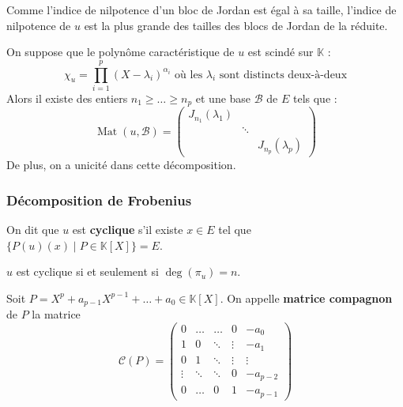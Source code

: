 	\begin{remark}
		Comme l'indice de nilpotence d'un bloc de Jordan est égal à sa taille, l'indice de nilpotence de $u$ est la plus grande des tailles des blocs de Jordan de la réduite.
	\end{remark}


	\begin{theorem}
		On suppose que le polynôme caractéristique de $u$ est scindé sur $\mathbb{K}$ :
		\[ \chi_u = \prod_{i=1}^p (X - \lambda_i)^{\alpha_i} \text{ où les } \lambda_i \text{ sont distincts deux-à-deux} \]
		Alors il existe des entiers $n_1 \geq \dots \geq n_p$ et une base $\mathcal{B}$ de $E$ tels que :
		\[ \operatorname{Mat}(u, \mathcal{B}) = \begin{pmatrix} J_{n_1}(\lambda_1) & & \\ & \ddots & \\ & & J_{n_p}(\lambda_p) \end{pmatrix} \]
		De plus, on a unicité dans cette décomposition.
	\end{theorem}

	\subsubsection{Décomposition de Frobenius}


	\begin{definition}
	  \label{151-2}
		On dit que $u$ est \textbf{cyclique} s'il existe $x \in E$ tel que $\{ P(u)(x) \mid P \in \mathbb{K}[X] \} = E$.
	\end{definition}

	\begin{proposition}
		$u$ est cyclique si et seulement si $\deg(\pi_u) = n$.
	\end{proposition}

	\begin{definition}
		Soit $P = X^p + a_{p-1} X^{p-1} + \dots + a_0 \in \mathbb{K}[X]$. On appelle \textbf{matrice compagnon} de $P$ la matrice
		\[ \mathcal{C}(P) = \begin{pmatrix} 0 & \dots & \dots & 0 & -a_0 \\ 1 & 0 & \ddots & \vdots & -a_1 \\ 0 & 1 & \ddots & \vdots & \vdots \\ \vdots & \ddots & \ddots & 0 & -a_{p-2} \\ 0 & \dots & 0 & 1 & -a_{p-1} \end{pmatrix} \]
	\end{definition}


